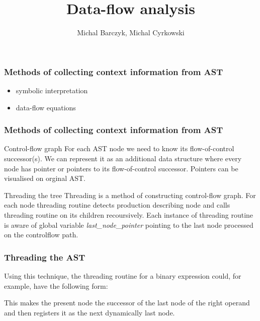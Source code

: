 \documentclass[presentation]{beamer}
\title{Data-flow analysis}
\author[]{Michal Barczyk, Michal Cyrkowski}
\institute[]{}
\date{}
\begin{document}
\begin{frame}
  \titlepage
\end{frame}

\begin{frame}
  \frametitle{Methods of collecting context information from AST}
  
   \begin{itemize}
    \item symbolic interpretation
    \item data-flow equations
    \end{itemize}
\end{frame}

\begin{frame}
  \frametitle{Methods of collecting context information from AST}
  

\begin{block}{Control-flow graph}
For each AST node we need to know its flow-of-control successor(s). We can represent it as an additional data structure where every node has pointer or pointers to its flow-of-control successor. Pointers can be visualised on orginal AST.
\end{block}

\begin{block}{Threading the tree}
Threading is a method of constructing control-flow graph. For each node threading routine detects production describing node and calls threading routine on its children recoursively. Each instance of threading routine is aware of global variable \emph{last\_node\_pointer} pointing to the last node processed on the controlflow
path.
\end{block}
   
\end{frame}

\begin{frame}
  \frametitle{Threading the AST}
  \begin{block}{}
    Using this technique, the threading routine for a binary expression could, for example, have the following form: 
    
    
    
    This makes the present node the successor of the last node of the right operand and then registers it as the next dynamically last node.
  \end{block}
  


  
\end{frame}
\end{document}
